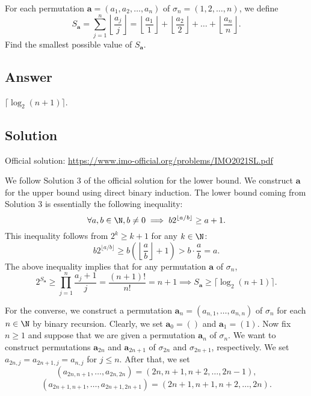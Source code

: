 For each permutation $\mathbf{a} = (a_1, a_2, \ldots, a_n)$ of $\sigma_n = (1, 2, \ldots, n)$, we define
\[ S_{\mathbf{a}} = \sum_{j = 1}^n \left\lfloor \frac{a_j}{j} \right\rfloor = \left\lfloor \frac{a_1}{1} \right\rfloor + \left\lfloor \frac{a_2}{2} \right\rfloor + \ldots + \left\lfloor \frac{a_n}{n} \right\rfloor. \]
Find the smallest possible value of $S_{\mathbf{a}}$.



\subsection*{Answer}

$\lceil \log_2 (n + 1) \rceil$.



\subsection*{Solution}

Official solution: \url{https://www.imo-official.org/problems/IMO2021SL.pdf}

We follow Solution 3 of the official solution for the lower bound.
We construct $\mathbf{a}$ for the upper bound using direct binary induction.
The lower bound coming from Solution 3 is essentially the following inequality:
\[ \forall a, b \in \N, b \neq 0 \implies b 2^{\lfloor a/b \rfloor} \geq a + 1. \]
This inequality follows from $2^k \geq k + 1$ for any $k \in \N$:
\[ b 2^{\lfloor a/b \rfloor} \geq b\left(\left\lfloor \frac{a}{b} \right\rfloor + 1\right) > b \cdot \frac{a}{b} = a. \]
The above inequality implies that for any permutation $\mathbf{a}$ of $\sigma_n$,
\[ 2^{S_{\mathbf{a}}} \geq \prod_{j = 1}^n \frac{a_j + 1}{j} = \frac{(n + 1)!}{n!} = n + 1 \implies S_{\mathbf{a}} \geq \lceil \log_2 (n + 1) \rceil. \]

For the converse, we construct a permutation $\mathbf{a}_n = (a_{n, 1}, \ldots, a_{n, n})$ of $\sigma_n$ for each $n \in \N$ by binary recursion.
Clearly, we set $\mathbf{a}_0 = ()$ and $\mathbf{a}_1 = (1)$.
Now fix $n \geq 1$ and suppose that we are given a permutation $\mathbf{a}_n$ of $\sigma_n$.
We want to construct permutations $\mathbf{a}_{2n}$ and $\mathbf{a}_{2n + 1}$ of $\sigma_{2n}$ and $\sigma_{2n + 1}$, respectively.
We set $a_{2n, j} = a_{2n + 1, j} = a_{n, j}$ for $j \leq n$.
After that, we set
\[ (a_{2n, n + 1}, \ldots, a_{2n, 2n}) = (2n, n + 1, n + 2, \ldots, 2n - 1), \]
\[ (a_{2n + 1, n + 1}, \ldots, a_{2n + 1, 2n + 1}) = (2n + 1, n + 1, n + 2, \ldots, 2n). \]

